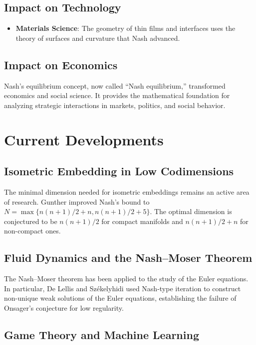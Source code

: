 \subsection{Impact on Technology}

\begin{itemize}
\item \textbf{Materials Science}: The geometry of thin films and interfaces uses the theory of surfaces and curvature that Nash advanced.
\end{itemize}

\subsection{Impact on Economics}

Nash's equilibrium concept, now called ``Nash equilibrium,'' transformed economics and social science. It provides the mathematical foundation for analyzing strategic interactions in markets, politics, and social behavior.

\section{Current Developments}

\subsection{Isometric Embedding in Low Codimensions}

The minimal dimension needed for isometric embeddings remains an active area of research. Gunther improved Nash's bound to $N = \max\{n(n+1)/2 + n, n(n+1)/2 + 5\}$. The optimal dimension is conjectured to be $n(n+1)/2$ for compact manifolds and $n(n+1)/2 + n$ for non-compact ones.

\subsection{Fluid Dynamics and the Nash--Moser Theorem}

The Nash--Moser theorem has been applied to the study of the Euler equations. In particular, De Lellis and Sz\'ekelyhidi used Nash-type iteration to construct non-unique weak solutions of the Euler equations, establishing the failure of Onsager's conjecture for low regularity.

\subsection{Game Theory and Machine Learning}

